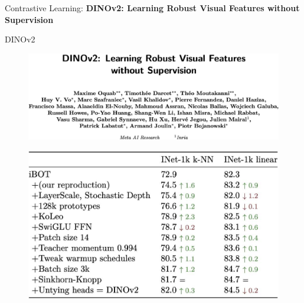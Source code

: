 \begin{frame}{}
    \LARGE Contrastive Learning: \textbf{DINOv2: Learning Robust Visual Features without Supervision}
\end{frame}

\begin{frame}[allowframebreaks]{DINOv2}
\begin{figure}
    \centering
    \includegraphics[width=\linewidth,height=0.9\textheight,keepaspectratio]{images/contrastive/slide_93_1_img.png}
\end{figure}

\framebreak

\begin{figure}
    \centering
    \includegraphics[width=\linewidth,height=0.9\textheight,keepaspectratio]{images/contrastive/slide_94_1_img.png}
\end{figure}

\framebreak


\end{frame}
